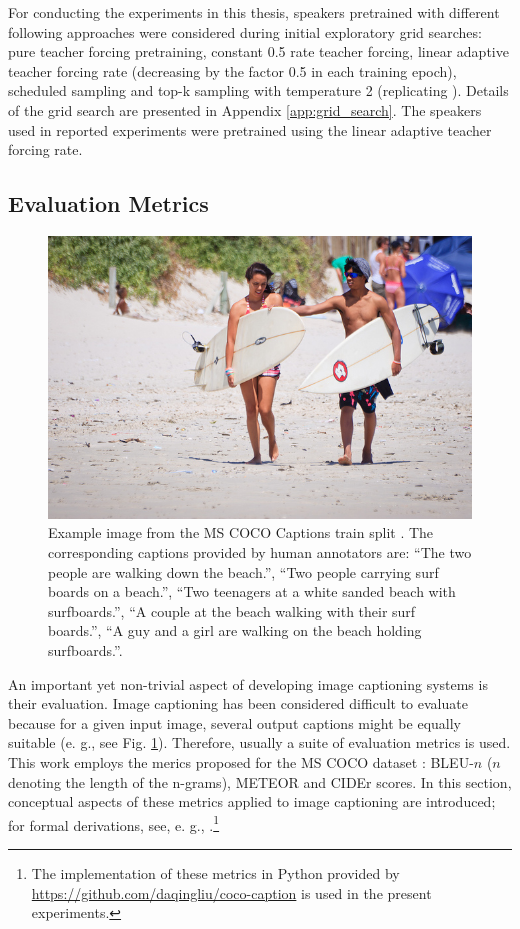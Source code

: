 For conducting the experiments in this thesis, speakers pretrained with different following approaches were considered during initial exploratory grid searches: pure teacher forcing pretraining, constant 0.5 rate teacher forcing, linear adaptive teacher forcing rate (decreasing by the factor 0.5 in each training epoch), scheduled sampling and top-k sampling with temperature 2 (replicating \cite{lazaridou2020multi}). Details of the grid search are presented in Appendix \ref{app:grid_search}. The speakers used in reported experiments were pretrained using the linear adaptive teacher forcing rate.

\subsection{Evaluation Metrics}
\label{image_cap_metrics}

\begin{figure}
	\centering
	\includegraphics[width=0.7\linewidth]{images/COCO_train2014_example.jpg}
	\caption{Example image from the MS COCO Captions train split \parencite{chen2015microsoft}. The corresponding captions provided by human annotators are: ``The two people are walking down the beach.'', ``Two people carrying surf boards on a beach.'', ``Two teenagers at a white sanded beach with surfboards.'', ``A couple at the beach walking with their surf boards.'', ``A guy and a girl are walking on the beach holding surfboards.''. }
	\label{fig:coco_example}
\end{figure}

An important yet non-trivial aspect of developing image captioning systems is their evaluation. Image captioning has been considered difficult to evaluate because for a given input image, several output captions might be equally suitable (e. g., see Fig. \ref{fig:coco_example}). Therefore, usually a suite of evaluation metrics is used. This work employs the merics proposed for the MS COCO dataset \parencite{chen2015microsoft}: BLEU-$n$ ($n$ denoting the length of the n-grams), METEOR and CIDEr scores. In this section, conceptual aspects of these metrics applied to image captioning are introduced; for formal derivations, see, e. g., \cite{chen2015microsoft}.\footnote{The implementation of these metrics in Python provided by \url{https://github.com/daqingliu/coco-caption} is used in the present experiments.}

